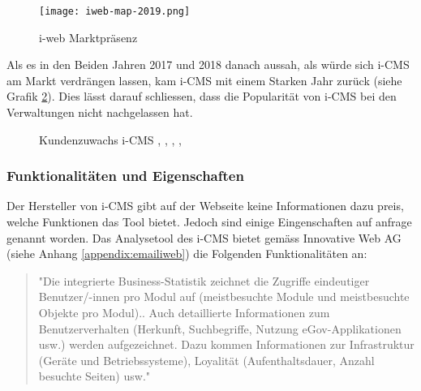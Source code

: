 \begin{figure}[h]
  \centering
  \texttt{[image: iweb-map-2019.png]}
  \caption{i-web Marktpräsenz \parencite[S. 14]{iweb2019revue}}
  \label{fig: iwebmap2019}
\end{figure}

Als es in den Beiden Jahren 2017 und 2018 danach aussah, als würde sich i-CMS am Markt verdrängen lassen, kam i-CMS mit einem Starken Jahr zurück (siehe Grafik \ref{fig:icmszuwachs}). Dies lässt darauf schliessen, dass die Popularität von i-CMS bei den Verwaltungen nicht nachgelassen hat.

\begin{figure}[h]
  \centering
  \caption{Kundenzuwachs i-CMS \parencite[S. 14]{iweb2015revue}, \parencite[S. 14]{iweb2016revue}, \parencite[S. 14]{iweb2017revue}, \parencite[S. 14]{iweb2018revue}, \parencite[S. 14]{iweb2019revue}}
  \label{fig:icmszuwachs}
\end{figure}

\subsubsection{Funktionalitäten und Eigenschaften}
Der Hersteller von i-CMS gibt auf der Webseite keine Informationen dazu preis, welche Funktionen das Tool bietet. Jedoch sind einige Eingenschaften auf anfrage genannt worden. Das Analysetool des i-CMS bietet gemäss Innovative Web AG (siehe Anhang \ref{appendix:emailiweb}) die Folgenden Funktionalitäten an:

\begin{quote}
  "Die integrierte Business-Statistik zeichnet die Zugriffe eindeutiger Benutzer/-innen pro Modul auf (meistbesuchte Module und meistbesuchte Objekte pro Modul).. Auch detaillierte Informationen zum Benutzerverhalten (Herkunft, Suchbegriffe, Nutzung eGov-Applikationen usw.) werden aufgezeichnet. Dazu kommen Informationen zur Infrastruktur (Geräte und Betriebssysteme), Loyalität (Aufenthaltsdauer, Anzahl besuchte Seiten) usw."
\end{quote}


